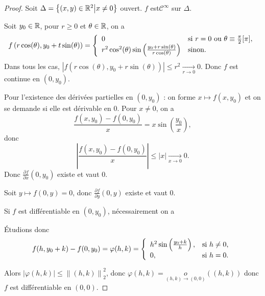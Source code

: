\documentclass[12pt]{article}
\begin{document}
\begin{proof}
	Soit $\Delta=\left\lbrace(x,y)\in\mathbb{R}^{2}\middle| x\neq0\right\rbrace$ ouvert. $f$ est$\mathcal{C}^{\infty}$ sur $\Delta$.

	Soit $y_0\in\mathbb{R}$, pour $r\geqslant0$ et $\theta\in\mathbb{R}$, on a 
	\begin{equation}
		f\left(r\cos(\theta),y_0+t\sin(\theta)\right)=
		\left\lbrace
			\begin{array}[]{ll}
				0 &\text{si }r=0\text{ ou }\theta\equiv\frac{\pi}{2}[\pi],\\
				r^{2}\cos^{2}(\theta)\sin\left(\frac{y_0+r\sin(\theta)}{r\cos(\theta)}\right) &\text{sinon}.
			\end{array}
		\right.
	\end{equation}
	Dans tous les cas, $\left\lvert f(r\cos(\theta),y_0+r\sin(\theta))\right\rvert\leqslant r^{2}\xrightarrow[r\to0]{}0.$ Donc $f$ est continue en $(0,y_0)$.

	Pour l'existence des dérivées partielles en $(0,y_0)$ : on forme $x\mapsto f(x,y_0)$ et on se demande si elle est dérivable en 0.
	Pour $x\neq 0$, on a 
	\begin{equation}
		\frac{f(x,y_0)-f(0,y_0)}{x}=x\sin\left(\frac{y_0}{x}\right),
	\end{equation}
	donc 
	\begin{equation}
		\left\lvert \frac{f(x,y_0)-f(0,y_0)}{x}\right\rvert\leqslant\left\lvert x\right\rvert\xrightarrow[x\to0]{}0.
	\end{equation}
	Donc $\frac{\partial f}{\partial x}(0,y_0)$ existe et vaut 0.

	Soit $y\mapsto f(0,y)=0$, donc $\frac{\partial f}{\partial y}(0,y)$ existe et vaut 0.

	Si $f$ est différentiable en $(0,y_0)$, nécessairement on a 

	Étudions donc 
	\begin{equation}
		f(h,y_0+k)-f(0,y_0)=\varphi(h,k)=
		\left\lbrace 
			\begin{array}[]{ll}
				h^{2}\sin\left(\frac{y_0+k}{h}\right), &\text{si }h\neq0,\\
				0, &\text{si }h=0.
			\end{array}
		\right.
	\end{equation}

	Alors $\left\lvert\varphi(h,k)\right\rvert\leqslant\left\lVert (h,k)\right\rVert_{2}^{2}$, donc $\varphi(h,k)=\underset{(h,k)\to(0,0)}{o}((h,k))$ donc $f$ est différentiable en $(0,0)$.


\end{proof}
\end{document}
